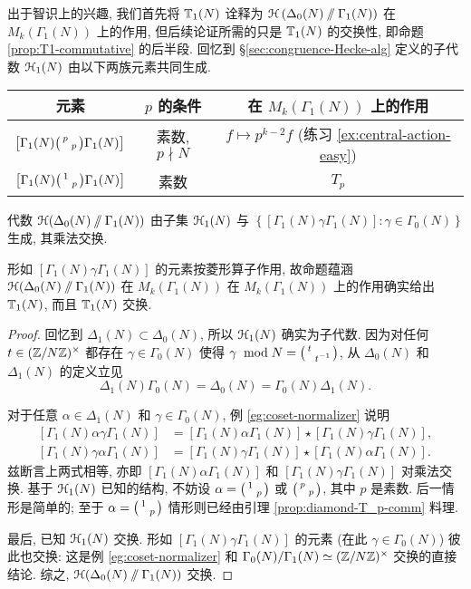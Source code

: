 出于智识上的兴趣, 我们首先将 $\mathbb{T}_1(N)$ 诠释为 $\EuScript{H}\left( \Delta_0(N) \sslash \Gamma_1(N) \right)$ 在 $M_k(\Gamma_1(N))$ 上的作用, 但后续论证所需的只是 $\mathbb{T}_1(N)$ 的交换性, 即命题 \ref{prop:T1-commutative} 的后半段. 回忆到 \S\ref{sec:congruence-Hecke-alg} 定义的子代数 $\EuScript{H}_1(N)$ 由以下两族元素共同生成.
\begin{center}\begin{tabular}{c|c|c}
	元素 & $p$ 的条件 & 在 $M_k(\Gamma_1(N))$ 上的作用 \\ \hline
	$\left[\Gamma_1(N) \bigl(\begin{smallmatrix} p &  \\  & p \end{smallmatrix}\bigr) \Gamma_1(N)\right]$ & 素数, $p \nmid N$ & $f \mapsto p^{k-2} f$ (练习 \ref{ex:central-action-easy}) \\
	$\left[\Gamma_1(N) \bigl(\begin{smallmatrix} 1 &  \\  & p \end{smallmatrix}\bigr) \Gamma_1(N)\right]$ & 素数 & $T_p$
\end{tabular}\end{center}
 
\begin{proposition}\label{prop:T1-commutative}
	代数 $\EuScript{H}(\Delta_0(N) \sslash \Gamma_1(N))$ 由子集 $\EuScript{H}_1(N)$ 与 $\left\{ [\Gamma_1(N)\gamma\Gamma_1(N)] : \gamma \in \Gamma_0(N) \right\}$ 生成, 其乘法交换.
\end{proposition}

形如 $[\Gamma_1(N)\gamma\Gamma_1(N)]$ 的元素按菱形算子作用, 故命题蕴涵 $\EuScript{H}(\Delta_0(N) \sslash \Gamma_1(N))$ 在 $M_k(\Gamma_1(N))$ 在 $M_k(\Gamma_1(N))$ 上的作用确实给出 $\mathbb{T}_1(N)$, 而且 $\mathbb{T}_1(N)$ 交换.

\begin{proof}
	回忆到 $\Delta_1(N) \subset \Delta_0(N)$, 所以 $\EuScript{H}_1(N)$ 确实为子代数. 因为对任何 $t \in (\mathbb{Z}/N\mathbb{Z})^\times$ 都存在 $\gamma \in \Gamma_0(N)$ 使得 $\gamma \;\bmod{N} = \bigl(\begin{smallmatrix} t &  \\  & t^{-1} \end{smallmatrix}\bigr)$, 从 $\Delta_0(N)$ 和 $\Delta_1(N)$ 的定义立见
	\[ \Delta_1(N) \Gamma_0(N) = \Delta_0(N) = \Gamma_0(N) \Delta_1(N). \]

	对于任意 $\alpha \in \Delta_1(N)$ 和 $\gamma \in \Gamma_0(N)$, 例 \ref{eg:coset-normalizer} 说明
	\begin{align*}
		\left[ \Gamma_1(N) \alpha \gamma \Gamma_1(N) \right] & = \left[ \Gamma_1(N)\alpha\Gamma_1(N) \right] \star \left[ \Gamma_1(N)\gamma\Gamma_1(N) \right], \\
		\left[ \Gamma_1(N) \gamma \alpha \Gamma_1(N) \right] & = \left[ \Gamma_1(N)\gamma\Gamma_1(N) \right] \star \left[ \Gamma_1(N)\alpha\Gamma_1(N) \right].
	\end{align*}
	兹断言上两式相等, 亦即 $\left[ \Gamma_1(N)\alpha\Gamma_1(N) \right]$ 和 $\left[ \Gamma_1(N)\gamma\Gamma_1(N) \right]$ 对乘法交换. 基于 $\EuScript{H}_1(N)$ 已知的结构, 不妨设 $\alpha = \bigl(\begin{smallmatrix} 1 &  \\  & p \end{smallmatrix}\bigr)$ 或 $\bigl(\begin{smallmatrix} p &  \\  & p \end{smallmatrix}\bigr)$, 其中 $p$ 是素数. 后一情形是简单的; 至于 $\alpha = \bigl(\begin{smallmatrix} 1 &  \\  & p \end{smallmatrix}\bigr)$ 情形则已经由引理 \ref{prop:diamond-T_p-comm} 料理.
	
	最后, 已知 $\EuScript{H}_1(N)$ 交换. 形如 $[\Gamma_1(N)\gamma\Gamma_1(N)]$ 的元素 (在此 $\gamma \in \Gamma_0(N)$) 彼此也交换: 这是例 \ref{eg:coset-normalizer} 和 $\Gamma_0(N)/\Gamma_1(N) \simeq (\mathbb{Z}/N\mathbb{Z})^\times$ 交换的直接结论. 综之, $\EuScript{H}(\Delta_0(N) \sslash \Gamma_1(N))$ 交换.
\end{proof}

